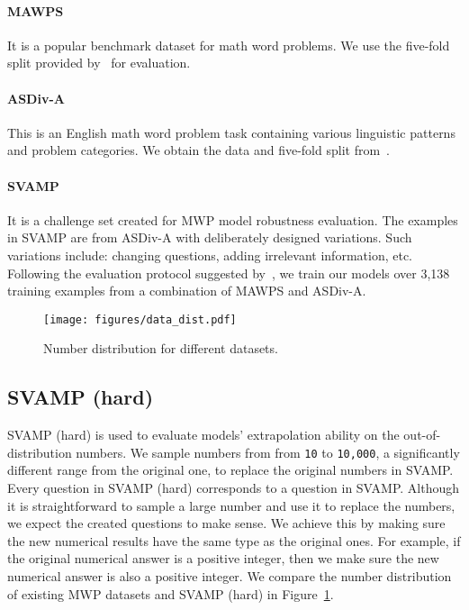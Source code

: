 \documentclass[11pt]{article}
\begin{document}
    \paragraph{MAWPS~\cite{koncel2016mawps}}
        It is a popular benchmark dataset for math word problems.
We use the five-fold split provided by~\citet{lan2021mwptoolkit} for evaluation.

    \paragraph{ASDiv-A~\cite{miao2020asdiv}}
        This is an English math word problem task containing various linguistic patterns and problem categories.
We obtain the data and five-fold split from~\citet{patel2021svamp}.
    
    \paragraph{SVAMP~\cite{patel2021svamp}}
        It is a challenge set created for MWP model robustness evaluation. 
The examples in SVAMP are from ASDiv-A with deliberately designed variations.
Such variations include: 
            changing questions, adding irrelevant information, etc.
Following the evaluation protocol suggested by~\citet{patel2021svamp},
            we train our models over 3,138 training examples from a combination of MAWPS and ASDiv-A.
    
\begin{figure}[t]
    \captionsetup{type=figure}
    \centering
    \texttt{[image: figures/data\_dist.pdf]}
    \vspace{-5pt}
    \caption{
        \label{fig:data_dist} 
        Number distribution for different datasets.
    }
    \vspace{-5pt}
\end{figure}

\subsection{SVAMP (hard)}\label{app:svamphard}
    SVAMP (hard) is used to evaluate models' extrapolation ability on the out-of-distribution numbers.
We sample numbers from from {\small \texttt{10}} to {\small \texttt{10,000}}, 
        a significantly different range from the original one,
        to replace the original numbers in SVAMP.
Every question in SVAMP (hard) corresponds to a question in SVAMP.
Although it is straightforward to sample a large number and use it to replace the numbers,
        we expect the created questions to make sense.
We achieve this by making sure the new numerical results have the same type as the original ones.
For example, if the original numerical answer is a positive integer,
        then we make sure the new numerical answer is also a positive integer.
We compare the number distribution of existing MWP datasets and SVAMP (hard) in Figure~\ref{fig:data_dist}.
    
\end{document}
